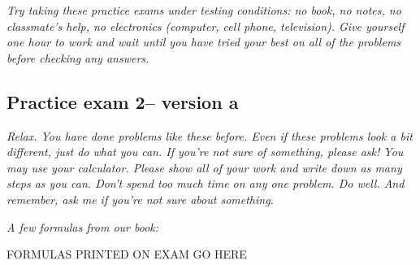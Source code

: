 \documentclass[12pt]{article}
\begin{document}
\emph{Try taking these practice exams under testing conditions:  no book, no notes, no classmate's help, no electronics (computer, cell phone, television). Give yourself one hour to work and wait until you have tried your best on all of the problems before checking any answers.}
\bigskip

\subsection*{Practice exam 2-- version a}
\bigskip
 \emph{Relax.  You have done problems like these before.  Even if these problems look a bit different, just do what you can.  If you're not sure of something, please ask! You may use your calculator.  Please show all of your work and write down as many steps as you can.  Don't spend too much time on any one problem.  Do well.  And remember, ask me if you're not sure about something.}
 
\bigskip
 
\emph{A few formulas from our book:}

\begin{center}

FORMULAS PRINTED ON EXAM GO HERE

\end{center}

\hspace{-.25in} \hrulefill
\end{document}
